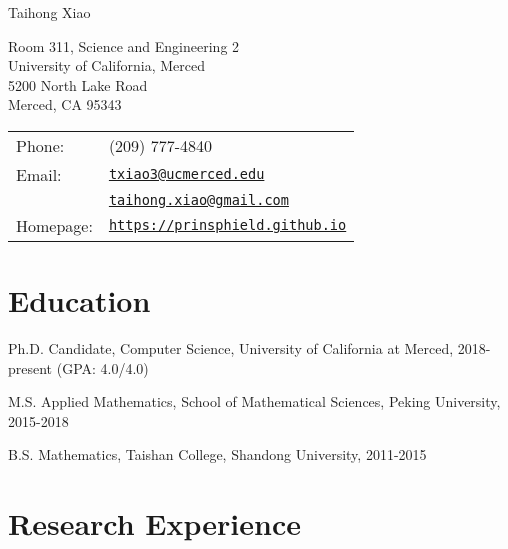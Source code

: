 \documentclass[letterpaper]{article}
\def\name{Taihong Xiao}
\renewenvironment{itemize}{
  \begin{list}{}{
    \setlength{\leftmargin}{1.5em}
  }
}{
  \end{list}
}
\begin{document}
{\huge \name}


\vspace{0.25in}



\begin{minipage}{0.45\linewidth}
	Room 311, Science and Engineering 2\\
	University of California, Merced\\
	5200 North Lake Road\\
	Merced, CA 95343
\end{minipage}
\begin{minipage}{0.45\linewidth}
  \begin{tabular}{ll}
    Phone:  & (209) 777-4840 \\
    Email:  & \href{mailto:txiao3@ucmerced.edu}{\tt txiao3@ucmerced.edu} \\
    		& \href{mailto:taihong.xiao@gmail.com}{\tt taihong.xiao@gmail.com}\\
    Homepage: & \href{https://prinsphield.github.io}{\tt https://prinsphield.github.io} \\
  \end{tabular}
\end{minipage}


\section*{Education}

\begin{itemize}

  \item Ph.D. Candidate, Computer Science, University of California at Merced, 2018-present (GPA: 4.0/4.0)

  \item M.S. Applied Mathematics, School of Mathematical Sciences, Peking University, 2015-2018

  \item B.S. Mathematics, Taishan College, Shandong University, 2011-2015

\end{itemize}



\section*{Research Experience}
\end{document}
